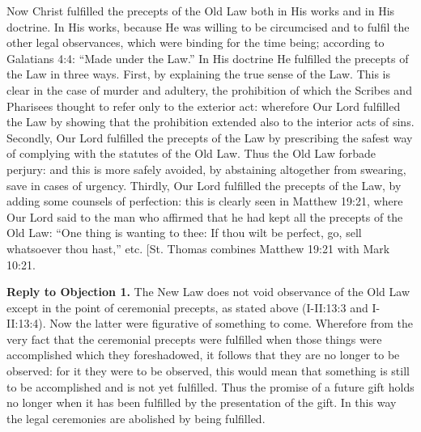 Now Christ fulfilled the precepts of the Old Law both in His works and in His doctrine. In His works, because He was willing to be circumcised and to fulfil the other legal observances, which were binding for the time being; according to Galatians 4:4: ``Made under the Law.'' In His doctrine He fulfilled the precepts of the Law in three ways. First, by explaining the true sense of the Law. This is clear in the case of murder and adultery, the prohibition of which the Scribes and Pharisees thought to refer only to the exterior act: wherefore Our Lord fulfilled the Law by showing that the prohibition extended also to the interior acts of sins. Secondly, Our Lord fulfilled the precepts of the Law by prescribing the safest way of complying with the statutes of the Old Law. Thus the Old Law forbade perjury: and this is more safely avoided, by abstaining altogether from swearing, save in cases of urgency. Thirdly, Our Lord fulfilled the precepts of the Law, by adding some counsels of perfection: this is clearly seen in Matthew 19:21, where Our Lord said to the man who affirmed that he had kept all the precepts of the Old Law: ``One thing is wanting to thee: If thou wilt be perfect, go, sell whatsoever thou hast,'' etc. [St. Thomas combines Matthew 19:21 with Mark 10:21.

\textbf{Reply to Objection 1.} The New Law does not void observance of the Old Law except in the point of ceremonial precepts, as stated above (I-II:13:3 and I-II:13:4). Now the latter were figurative of something to come. Wherefore from the very fact that the ceremonial precepts were fulfilled when those things were accomplished which they foreshadowed, it follows that they are no longer to be observed: for it they were to be observed, this would mean that something is still to be accomplished and is not yet fulfilled. Thus the promise of a future gift holds no longer when it has been fulfilled by the presentation of the gift. In this way the legal ceremonies are abolished by being fulfilled.

